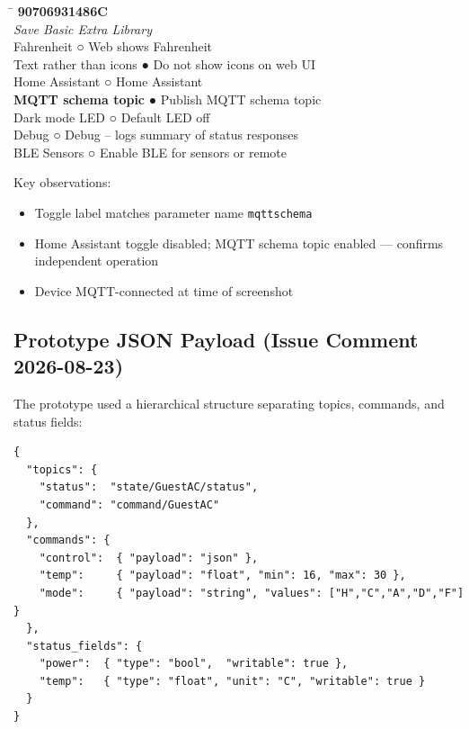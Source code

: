 \documentclass[11pt,a4paper]{article}
\newcommand{\param}[1]{\texttt{\color{primary}#1}}
\begin{document}
\begin{center}
\begin{mdframed}[backgroundcolor=lightbg, linewidth=0.5pt]
\ttfamily\small
\begin{tabbing}
\hspace{5.5cm}\=\kill
\textbf{90706931486C} \>  \\[6pt]
\textit{Save \quad Basic \quad [Faikout] \quad Extra \quad Library} \\[10pt]
Fahrenheit              \> ○ \quad Web shows Fahrenheit \\
Text rather than icons  \> ● \quad Do not show icons on web UI \\
Home Assistant          \> ○ \quad Home Assistant \\
\textcolor{codegreen}{\textbf{MQTT schema topic}}   \> \textcolor{codegreen}{● \quad Publish MQTT schema topic} \\
Dark mode LED           \> ○ \quad Default LED off \\
Debug                   \> ○ \quad Debug – logs summary of status responses \\
BLE Sensors             \> ○ \quad Enable BLE for sensors or remote \\
\end{tabbing}
\end{mdframed}
\end{center}

Key observations:
\begin{itemize}[noitemsep]
  \item Toggle label matches parameter name \param{mqttschema}
  \item Home Assistant toggle disabled; MQTT schema topic enabled — confirms independent operation
  \item Device MQTT-connected at time of screenshot
\end{itemize}

\subsection{Prototype JSON Payload (Issue Comment 2026-08-23)}

The prototype used a hierarchical structure separating topics, commands, and status fields:

\begin{lstlisting}[style=json]
{
  "topics": {
    "status":  "state/GuestAC/status",
    "command": "command/GuestAC"
  },
  "commands": {
    "control":  { "payload": "json" },
    "temp":     { "payload": "float", "min": 16, "max": 30 },
    "mode":     { "payload": "string", "values": ["H","C","A","D","F"] }
  },
  "status_fields": {
    "power":  { "type": "bool",  "writable": true },
    "temp":   { "type": "float", "unit": "C", "writable": true }
  }
}
\end{lstlisting}
\end{document}
